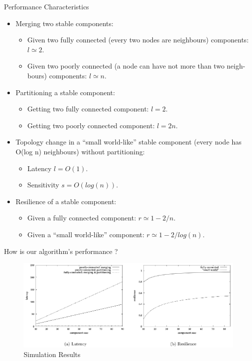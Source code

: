 \documentclass{beamer}
\begin{document}
\begin{frame}{Performance Characteristics}
\begin{itemize}
	\item Merging two stable components:
	\begin{itemize}
		\item Given two fully connected (every two nodes are neighbours) components: $l \simeq 2$.
		\item Given two poorly connected (a node can have not more than two neigh- bours) components: $l \simeq n$.
	\end{itemize}

	\item Partitioning a stable component:
	\begin{itemize}
		\item Getting two fully connected component: $l = 2$.
		\item Getting two poorly connected component: $l = 2n$.
	\end{itemize}
	

\end{itemize}
\end{frame}
\begin{frame}
	\begin{itemize}
		\item Topology change in a “small world-like” stable component (every node has O(log n) neighbours) without partitioning:
		\begin{itemize}
			\item Latency $l = O(1)$.
			\item Sensitivity $s = O(log(n))$.
		\end{itemize}
		\item Resilience of a stable component:
		\begin{itemize}
			\item Given a fully connected component: $r \simeq 1 - 2/n$.
			\item Given a “small world-like” component: $r \simeq 1 - 2/log(n)$.
		\end{itemize}
	\end{itemize}
\end{frame}


\begin{frame}{How is our algorithm's performance ?}
	\begin{figure}
		\centering
		\includegraphics[width=1.1\linewidth]{performance_test}
		\caption{Simulation Results}
		\label{fig:performancetest}
	\end{figure}
	
\end{frame}
\end{document}
